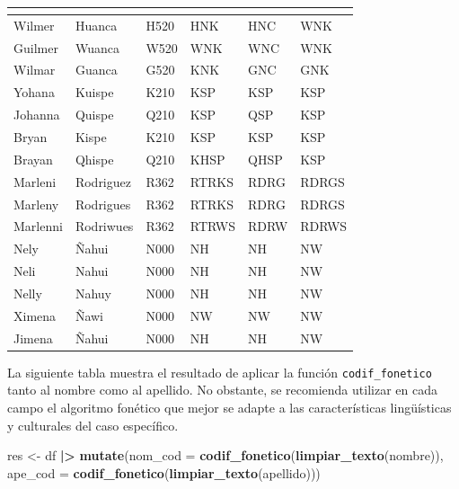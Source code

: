 \documentclass[
  12pt,
]{book}
\newenvironment{Shaded}{\begin{snugshade}}{\end{snugshade}}
\newcommand{\AttributeTok}[1]{\textcolor[rgb]{0.13,0.29,0.53}{#1}}
\newcommand{\FunctionTok}[1]{\textcolor[rgb]{0.13,0.29,0.53}{\textbf{#1}}}
\newcommand{\NormalTok}[1]{#1}
\newcommand{\OtherTok}[1]{\textcolor[rgb]{0.56,0.35,0.01}{#1}}
\newcommand{\SpecialCharTok}[1]{\textcolor[rgb]{0.81,0.36,0.00}{\textbf{#1}}}
\begin{document}
\begin{table}[t]
\fontsize{12.0pt}{14.0pt}\selectfont
\begin{tabular*}{\linewidth}{@{\extracolsep{\fill}}llllll}
\toprule
{\bfseries \cellcolor[HTML]{F9F9F9}{nombre}} & {\bfseries \cellcolor[HTML]{F9F9F9}{apellido}} & {\bfseries \cellcolor[HTML]{F9F9F9}{soundex}} & {\bfseries \cellcolor[HTML]{F9F9F9}{metaphone}} & {\bfseries \cellcolor[HTML]{F9F9F9}{statcan}} & {\bfseries \cellcolor[HTML]{F9F9F9}{latino}} \\ 
\midrule\addlinespace[2.5pt]
Wilmer & Huanca & H520 & HNK & HNC & WNK \\ 
Guilmer & Wuanca & W520 & WNK & WNC & WNK \\ 
Wilmar & Guanca & G520 & KNK & GNC & GNK \\ 
Yohana & Kuispe & K210 & KSP & KSP & KSP \\ 
Johanna & Quispe & Q210 & KSP & QSP & KSP \\ 
Bryan & Kispe & K210 & KSP & KSP & KSP \\ 
Brayan & Qhispe & Q210 & KHSP & QHSP & KSP \\ 
Marleni & Rodriguez & R362 & RTRKS & RDRG & RDRGS \\ 
Marleny & Rodrigues & R362 & RTRKS & RDRG & RDRGS \\ 
Marlenni & Rodriwues & R362 & RTRWS & RDRW & RDRWS \\ 
Nely & \~Nahui & N000 & NH & NH & NW \\ 
Neli & Nahui & N000 & NH & NH & NW \\ 
Nelly & Nahuy & N000 & NH & NH & NW \\ 
Ximena & \~Nawi & N000 & NW & NW & NW \\ 
Jimena & \~Nahui & N000 & NH & NH & NW \\ 
\bottomrule
\end{tabular*}
\end{table}

La siguiente tabla muestra el resultado de aplicar la función \texttt{codif\_fonetico} tanto al nombre como al apellido. No obstante, se recomienda utilizar en cada campo el algoritmo fonético que mejor se adapte a las características lingüísticas y culturales del caso específico.

\begin{Shaded}
\begin{Highlighting}[]
\NormalTok{res }\OtherTok{\textless{}{-}}\NormalTok{ df }\SpecialCharTok{|\textgreater{}} 
         \FunctionTok{mutate}\NormalTok{(}\AttributeTok{nom\_cod =} \FunctionTok{codif\_fonetico}\NormalTok{(}\FunctionTok{limpiar\_texto}\NormalTok{(nombre)),}
                \AttributeTok{ape\_cod =} \FunctionTok{codif\_fonetico}\NormalTok{(}\FunctionTok{limpiar\_texto}\NormalTok{(apellido)))}
\end{Highlighting}
\end{Shaded}
\end{document}
